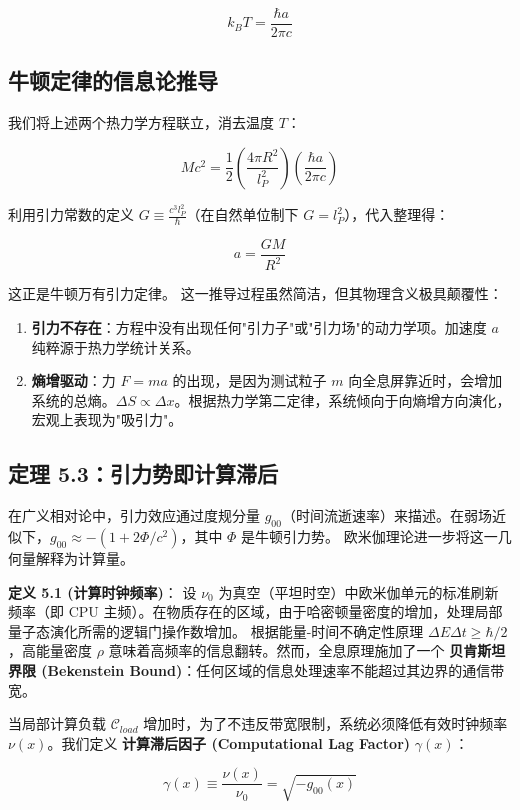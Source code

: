 \[k_B T = \frac{\hbar a}{2\pi c}\]

\subsection{牛顿定律的信息论推导}

我们将上述两个热力学方程联立，消去温度 $T$：

\[Mc^2 = \frac{1}{2} \left( \frac{4\pi R^2}{l_P^2} \right) \left( \frac{\hbar a}{2\pi c} \right)\]

利用引力常数的定义 $G \equiv \frac{c^3 l_P^2}{\hbar}$（在自然单位制下 $G=l_P^2$），代入整理得：

\[a = \frac{G M}{R^2}\]

这正是牛顿万有引力定律。
这一推导过程虽然简洁，但其物理含义极具颠覆性：

\begin{enumerate}
\item \textbf{引力不存在}：方程中没有出现任何"引力子"或"引力场"的动力学项。加速度 $a$ 纯粹源于热力学统计关系。
\item \textbf{熵增驱动}：力 $F = ma$ 的出现，是因为测试粒子 $m$ 向全息屏靠近时，会增加系统的总熵。$\Delta S \propto \Delta x$。根据热力学第二定律，系统倾向于向熵增方向演化，宏观上表现为"吸引力"。
\end{enumerate}

\subsection{定理 5.3：引力势即计算滞后}

在广义相对论中，引力效应通过度规分量 $g_{00}$（时间流逝速率）来描述。在弱场近似下，$g_{00} \approx -(1 + 2\Phi/c^2)$，其中 $\Phi$ 是牛顿引力势。
欧米伽理论进一步将这一几何量解释为计算量。

\textbf{定义 5.1 (计算时钟频率)}：
设 $\nu_0$ 为真空（平坦时空）中欧米伽单元的标准刷新频率（即 CPU 主频）。在物质存在的区域，由于哈密顿量密度的增加，处理局部量子态演化所需的逻辑门操作数增加。
根据能量-时间不确定性原理 $\Delta E \Delta t \ge \hbar/2$，高能量密度 $\rho$ 意味着高频率的信息翻转。然而，全息原理施加了一个 \textbf{贝肯斯坦界限 (Bekenstein Bound)}：任何区域的信息处理速率不能超过其边界的通信带宽。

当局部计算负载 $\mathcal{C}_{load}$ 增加时，为了不违反带宽限制，系统必须降低有效时钟频率 $\nu(x)$。我们定义 \textbf{计算滞后因子 (Computational Lag Factor)} $\gamma(x)$：

\[\gamma(x) \equiv \frac{\nu(x)}{\nu_0} = \sqrt{-g_{00}(x)}\]

